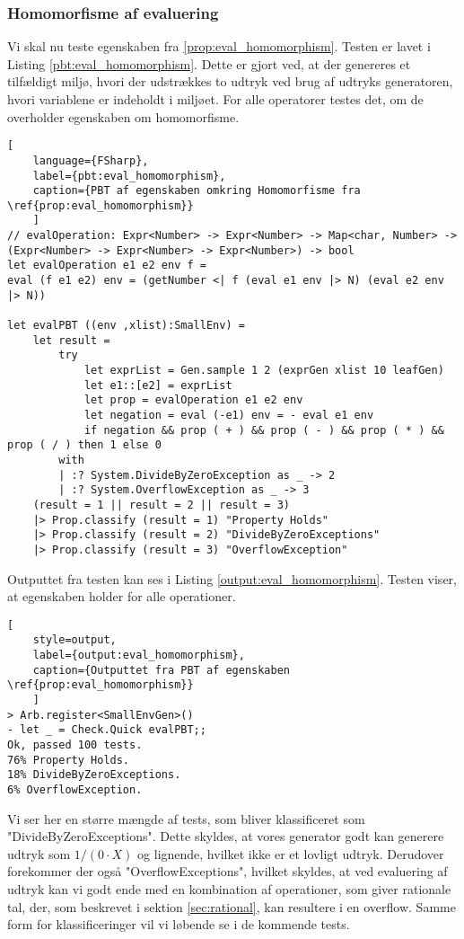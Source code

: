 \subsubsection{Homomorfisme af evaluering}\label{sec:PBT_eval_homomorphism}

Vi skal nu teste egenskaben fra \ref{prop:eval_homomorphism}. Testen er lavet i Listing \ref{pbt:eval_homomorphism}. Dette er gjort ved, at der genereres et tilfældigt miljø, hvori der udstrækkes to udtryk ved brug af udtryks generatoren, hvori variablene er indeholdt i miljøet. For alle operatorer testes det, om de overholder egenskaben om homomorfisme.


\begin{lstlisting}[
    language={FSharp}, 
    label={pbt:eval_homomorphism}, 
    caption={PBT af egenskaben omkring Homomorfisme fra \ref{prop:eval_homomorphism}}
    ]
// evalOperation: Expr<Number> -> Expr<Number> -> Map<char, Number> -> (Expr<Number> -> Expr<Number> -> Expr<Number>) -> bool
let evalOperation e1 e2 env f =
eval (f e1 e2) env = (getNumber <| f (eval e1 env |> N) (eval e2 env |> N))
 
let evalPBT ((env ,xlist):SmallEnv) = 
    let result = 
        try
            let exprList = Gen.sample 1 2 (exprGen xlist 10 leafGen)
            let e1::[e2] = exprList
            let prop = evalOperation e1 e2 env
            let negation = eval (-e1) env = - eval e1 env
            if negation && prop ( + ) && prop ( - ) && prop ( * ) && prop ( / ) then 1 else 0
        with
        | :? System.DivideByZeroException as _ -> 2
        | :? System.OverflowException as _ -> 3
    (result = 1 || result = 2 || result = 3)
    |> Prop.classify (result = 1) "Property Holds"
    |> Prop.classify (result = 2) "DivideByZeroExceptions"
    |> Prop.classify (result = 3) "OverflowException"    
\end{lstlisting}

Outputtet fra testen kan ses i Listing \ref{output:eval_homomorphism}. Testen viser, at egenskaben holder for alle operationer.

\begin{lstlisting}[
    style=output, 
    label={output:eval_homomorphism}, 
    caption={Outputtet fra PBT af egenskaben \ref{prop:eval_homomorphism}}
    ]
> Arb.register<SmallEnvGen>()
- let _ = Check.Quick evalPBT;;
Ok, passed 100 tests.
76% Property Holds.
18% DivideByZeroExceptions.
6% OverflowException.
\end{lstlisting}
Vi ser her en større mængde af tests, som bliver klassificeret som "DivideByZeroExceptions". Dette skyldes, at vores generator godt kan generere udtryk som \(1/(0 \cdot X)\) og lignende, hvilket ikke er et lovligt udtryk. Derudover forekommer der også "OverflowExceptions", hvilket skyldes, at ved evaluering af udtryk kan vi godt ende med en kombination af operationer, som giver rationale tal, der, som beskrevet i sektion \ref{sec:rational}, kan resultere i en overflow. Samme form for klassificeringer vil vi løbende se i de kommende tests.



